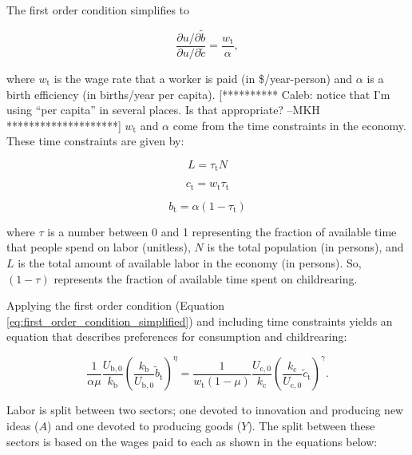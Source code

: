 \documentclass[letterpaper,12pt]{article}
\begin{document}
\noindent The first order condition simplifies to 

\begin{equation} \label{eq:first_order_condition_simplified}
	\frac{\partial u/ \partial\tilde b}{\partial u/ \partial\tilde c} = \frac{w_\mathrm{t}}{\alpha},
\end{equation}

\noindent where $w_\mathrm{t}$ is the wage rate that a worker is paid (in \$/year-person) and $\alpha$ is a birth efficiency (in births/year per capita). [********** Caleb: notice that I'm using ``per capita'' in several places. Is that appropriate? --MKH ********************] $w_\mathrm{t}$ and $\alpha$ come from the time constraints in the economy. These time constraints are given by:

\begin{equation}\label{eq:pop_work}
	L = \tau_\mathrm{t} N
\end{equation}

\begin{equation} \label{eq:consumption_constraint}
	c_\mathrm{t} = w_\mathrm{t} \tau_\mathrm{t}
\end{equation}

\begin{equation} \label{eq:birth_constraint}
	b_\mathrm{t} = \alpha (1-\tau_\mathrm{t})
\end{equation}

\noindent where $\tau$ is a number between 0 and 1 representing the fraction of available time that people spend on labor (unitless), $N$ is the total population (in persons), and $L$ is the total amount of available labor in the economy (in persons). So, $(1-\tau)$ represents the fraction of available time spent on childrearing.

Applying the first order condition (Equation \ref{eq:first_order_condition_simplified}) and including time constraints yields an equation that describes preferences for consumption and childrearing:

\begin{equation} \label{eq:FOC_and_time_constraints}
	\frac{1}{\alpha \mu} \frac{U_\mathrm{b,0}}{k_\mathrm{b}} \left( \frac{k_\mathrm{b}}{U_\mathrm{b,0}} \tilde b_\mathrm{t} \right) ^{\eta} 
	= \frac{1}{w_\mathrm{t}(1-\mu)} \frac{U_\mathrm{c,0}}{k_\mathrm{c}}  \left( \frac{k_\mathrm{c}}{U_\mathrm{c,0}} \tilde c_\mathrm{t} \right)^\gamma .
\end{equation}

Labor is split between two sectors; one devoted to innovation and producing new ideas ($A$) and one devoted to producing goods ($Y$). The split between these sectors is based on the wages paid to each as shown in the equations below:
\end{document}
